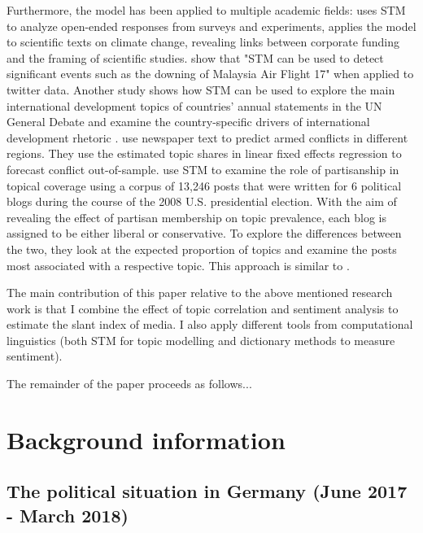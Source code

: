 \documentclass[12pt,a4paper,notitlepage]{article}
\begin{document}
Furthermore, the model has been applied to multiple academic fields: \citet{roberts_structural_2014} uses STM to analyze open-ended responses from surveys and experiments, \citet{farrell_corporate_2016} applies the model to scientific texts on climate change, revealing links between corporate funding and the framing of scientific studies. \citet{mishler_using_2015} show that "STM can be used to detect significant events such as the downing of Malaysia Air Flight 17" when applied to twitter data. Another study shows how STM can be used to explore the main international development topics of countries' annual statements in the UN General Debate and examine the country-specific drivers of international development rhetoric \citep{baturo_what_2017}. \citet{mueller_reading_2016} use newspaper text to predict armed conflicts in different regions. They use the estimated topic shares in linear fixed effects regression to forecast conflict out-of-sample. \citet{roberts_navigating_2016} use STM to examine the role of partisanship in topical coverage using a corpus of 13,246 posts that were written for 6 political blogs during the course of the 2008 U.S. presidential election. With the aim of revealing the effect of partisan membership on topic prevalence, each blog is assigned to be either liberal or conservative. To explore the differences between the two, they look at the expected proportion of topics and examine the posts most associated with a respective topic. This approach is similar to \citet{roberts_model_2016}. 

The main contribution of this paper relative to the above mentioned research work is that I combine the effect of topic correlation \citep{eberl_one_2017} and sentiment analysis \citep{dewenter_can_2018, junque_de_fortuny_evaluating_2014, eberl_one_2017} to estimate the slant index of media. I also apply different tools from computational linguistics (both STM for topic modelling and dictionary methods to measure sentiment).

The remainder of the paper proceeds as follows... 

\section{Background information}\label{ch_elections}

\subsection{The political situation in Germany (June 2017 - March 2018)}
\end{document}
